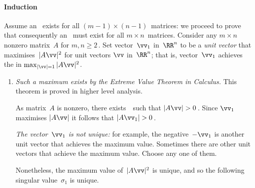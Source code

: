 \paragraph{Induction}  
Assume  an \svd\ exists for all \((m-1)\times(n-1)\)~matrices: we proceed to prove that consequently an \svd\ must exist for all \(m\times n\)~matrices.
Consider any \(m\times n\) nonzero matrix~\(A\) for \(m,n\geq2\)\,.
Set vector~\(\vv_1\) in~\(\RR^n\) to be a \emph{unit vector} that maximises~\(|A\vv|^2\) for unit vectors \(\vv\) in~\(\RR^n\); that is, vector~\(\vv_1\) achieves the  in \(\max_{|\vv|=1}|A\vv|^2\).
\begin{enumerate}
\item \emph{Such a maximum exists by the Extreme Value Theorem in Calculus.}
This theorem is proved in higher level analysis.

%
As matrix~\(A\) is nonzero, there exists~\vv\ such that \(|A\vv|>0\)\,.
Since \(\vv_1\) maximises \(|A\vv|\) it follows that \(|A\vv_1|>0\)\,.

\emph{The vector~\(\vv_1\) is not unique:} for example, the negative~\(-\vv_1\) is another unit vector that achieves the maximum value.  
Sometimes there are other unit vectors that achieve the maximum value. 
Choose any one of them. 

Nonetheless, the maximum value of~\(|A\vv|^2\) is unique, and so the following singular value~\(\sigma_1\) is unique.


\end{enumerate}
